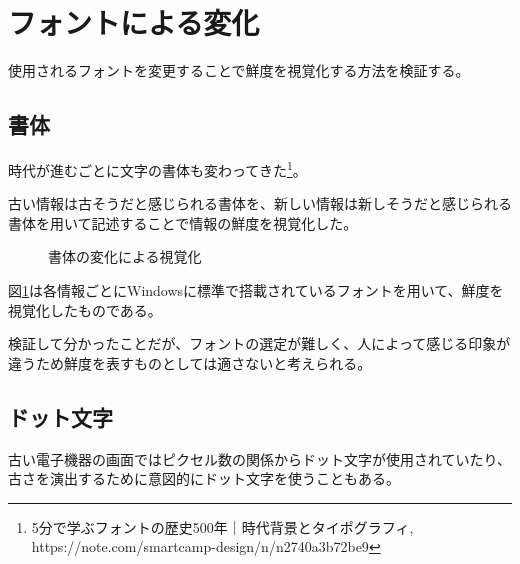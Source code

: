 \section{フォントによる変化}
\label{sec:ver-font}

使用されるフォントを変更することで鮮度を視覚化する方法を検証する。

\subsection{書体}
\label{subsec:ver-fnt-stl}

時代が進むごとに文字の書体も変わってきた\footnote{5分で学ぶフォントの歴史500年｜時代背景とタイポグラフィ, https://note.com/smartcamp-design/n/n2740a3b72be9}。

古い情報は古そうだと感じられる書体を、新しい情報は新しそうだと感じられる書体を用いて記述することで情報の鮮度を視覚化した。

\begin{figure}[htbp]
  \begin{center}
  \end{center}
  \caption{書体の変化による視覚化}
  \label{fig:ver-style}
\end{figure}

図\ref{fig:ver-style}は各情報ごとにWindowsに標準で搭載されているフォントを用いて、鮮度を視覚化したものである。

検証して分かったことだが、フォントの選定が難しく、人によって感じる印象が違うため鮮度を表すものとしては適さないと考えられる。

\subsection{ドット文字}
\label{subsec:ver-fnt-dot}

古い電子機器の画面ではピクセル数の関係からドット文字が使用されていたり、古さを演出するために意図的にドット文字を使うこともある。

